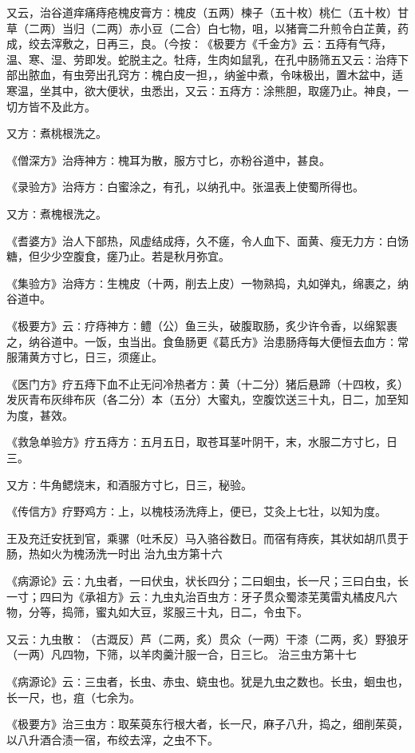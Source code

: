 \documentclass[a4paper,12pt,UTF8,twoside]{ctexbook}
\begin{document}
又云，治谷道痒痛痔疮槐皮膏方∶槐皮（五两）楝子（五十枚）桃仁（五十枚）甘草（二两）当归（二两）赤小豆（二合）白七物，咀，以猪膏二升煎令白芷黄，药成，绞去滓敷之，日再三，良。（今按∶《极要方《千金方》云∶五痔有气痔，温、寒、湿、劳即发。蛇脱主之。牡痔，生肉如鼠乳，在孔中肠筛五又云∶治痔下部出脓血，有虫旁出孔窍方∶槐白皮一担，，纳釜中煮，令味极出，置木盆中，适寒温，坐其中，欲大便状，虫悉出，又云∶五痔方∶涂熊胆，取瘥乃止。神良，一切方皆不及此方。

又方∶煮桃根洗之。

《僧深方》治痔神方∶槐耳为散，服方寸匕，亦粉谷道中，甚良。

《录验方》治痔方∶白蜜涂之，有孔，以纳孔中。张温表上使蜀所得也。

又方∶煮槐根洗之。

《耆婆方》治人下部热，风虚结成痔，久不瘥，令人血下、面黄、瘦无力方∶白饧糖，但少少空腹食，瘥乃止。若是秋月弥宜。

《集验方》治痔方∶生槐皮（十两，削去上皮）一物熟捣，丸如弹丸，绵裹之，纳谷道中。

《极要方》云∶疗痔神方∶鳢（公）鱼三头，破腹取肠，炙少许令香，以绵絮裹之，纳谷道中。一饭，虫当出。食鱼肠更《葛氏方》治患肠痔每大便恒去血方∶常服蒲黄方寸匕，日三，须瘥止。

《医门方》疗五痔下血不止无问冷热者方∶黄（十二分）猪后悬蹄（十四枚，炙）发灰青布灰绯布灰（各二分）本（五分）大蜜丸，空腹饮送三十丸，日二，加至知为度，甚效。

《救急单验方》疗五痔方∶五月五日，取苍耳茎叶阴干，末，水服二方寸匕，日三。

又方∶牛角鳃烧末，和酒服方寸匕，日三，秘验。

《传信方》疗野鸡方∶上，以槐枝汤洗痔上，便已，艾灸上七壮，以知为度。

王及充迁安抚到官，乘骡（吐禾反）马入骆谷数日。而宿有痔疾，其状如胡爪贯于肠，热如火为槐汤洗一时出
治九虫方第十六

《病源论》云∶九虫者，一曰伏虫，状长四分；二曰蛔虫，长一尺；三曰白虫，长一寸；四曰为《承祖方》云∶九虫丸治百虫方∶牙子贯众蜀漆芜荑雷丸橘皮凡六物，分等，捣筛，蜜丸如大豆，浆服三十丸，日二，令虫下。

又云∶九虫散∶（古溉反）芦（二两，炙）贯众（一两）干漆（二两，炙）野狼牙（一两）凡四物，下筛，以羊肉羹汁服一合，日三匕。
治三虫方第十七

《病源论》云∶三虫者，长虫、赤虫、蛲虫也。犹是九虫之数也。长虫，蛔虫也，长一尺，也，疽（七余为。

《极要方》治三虫方∶取茱萸东行根大者，长一尺，麻子八升，捣之，细削茱萸，以八升酒合渍一宿，布绞去滓，之虫不下。
\end{document}
